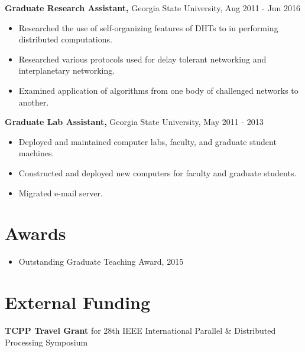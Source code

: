 \documentclass{res}
\begin{document}
\begin{resume}
{\bf Graduate Research Assistant,} Georgia State University, Aug 2011 - Jun 2016
     \begin{itemize}
     \item Researched the use of self-organizing features of DHTs to in performing distributed computations.
     \item Researched various protocols used for delay tolerant networking and interplanetary networking.
     \item Examined application of algorithms from one body of challenged networks to another.
  
     \end{itemize}   
     
{\bf Graduate Lab Assistant,} Georgia State University, May 2011 - 2013
     \begin{itemize}
     \item Deployed and maintained computer labs, faculty, and graduate student machines.
     \item Constructed and deployed new computers for faculty and graduate students.
     \item Migrated e-mail server.
     \end{itemize}
     

\section{Awards}
\begin{itemize}    
	\item Outstanding Graduate Teaching Award, 2015
\end{itemize}   

\section{External Funding}
\textbf{TCPP Travel Grant} for 28th IEEE International Parallel \& Distributed Processing Symposium





\end{resume}
\end{document}
